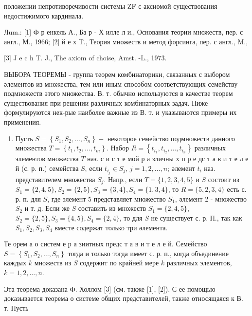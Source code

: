 \documentclass[10pt]{article}
\begin{document}
положении непротиворечивости системы ZF с аксиомой существования недостижимого кардинала.



Лum.: [1] Ф р енкель А., Ба р - Х илле л и., Основания теории множеств, пер. с англ., М., 1966; [2] й е х T., Теория множеств и метод форсинга, пер. с англ., M.,

[3] J e c h T. J., The axiom of choise, Amst. -L., 1973.



ВЫБОРА ТЕОРЕМЫ - группа теорем комбинаторики, связанных с выбором әлементов из множества, тем или иным способом соответствующих семейству подмножеств этого множества. В. т. обычно используются в качестве теорем существования при решении различных комбинаторных задач. Ниже формулируются нек-рые наиболее важные из В. т. и указываются примеры их применения.



\begin{enumerate}

  \item Пусть $S=\left\{S_{1}, S_{2}, \ldots, S_{n}\right\}-$ некоторое семейство подмножеств данного множества $T=\left\{t_{1}, t_{2}, \ldots, t_{m}\right\}$. Набор $R=\left\{t_{i_{1}}, t_{i_{2}}, \ldots, t_{i_{n}}\right\}$ различных элементов множества $T$ наз. с и с т е мой р а зличны х п р е дс т а в и т е л е й (с. р. п.) семейства $S$, если $t_{i_{j}} \in S_{j}$, $j=1,2, \ldots, n$; әлемент $t_{i}$ наз. представителем множества $S_{j}$. Напр., если $T=\{1,2,3,4,5\}$ и $S$ состоит из $S_{1}=\{2,4,5\}, S_{2}=\{2,5\}, S_{3}=\{3,4\}, S_{4}=\{1,3,4\}$, то $R=\{5,2,3,4\}$ есть с. р. п. для $S$, где элемент 5 представляет множество $S_{1}$, әлемент 2 - множество $S_{2}$ и т. д. Если же $S$ составить из множеств $S_{1}=\{2,4,5\}$, $S_{2}=\{2,5\}, S_{3}=\{4,5\}, S_{4}=\{2,4\}$, то для $S$ не существует с. р. П., так как $S_{1}, S_{2}, S_{3}, S_{4}$ вместе содержат только три әлемента.

\end{enumerate}



Те орем а о систем е р а зиитных предс т а в и т е л е й. Семейство $S=\left\{S_{1}, S_{2}, \ldots, S_{n}\right\}$ тогда и только тогда имеет с. р. п., когда объединение каждых $k$ множеств из $S$ содержит по крайней мере $k$ различных элементов, $k=1,2, \ldots, n$.



Эта теорема доказана Ф. Холлом [3] (см. также [1], [2]). С ее помощью доказывается теорема о системе общих представителей, также относящаяся к В. т. Пусть
\end{document}
